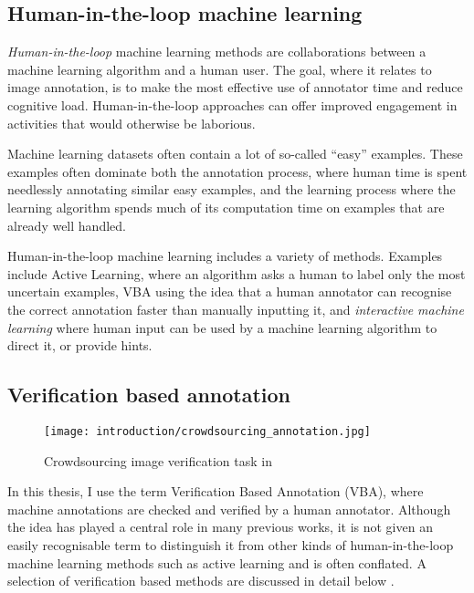 \subsection{Human-in-the-loop machine learning}

\emph{Human-in-the-loop} machine learning methods are collaborations between a machine learning algorithm and a human user. The goal, where it relates to image annotation, is to make the most effective use of annotator time and reduce cognitive load. Human-in-the-loop approaches can offer improved engagement in activities that would otherwise be laborious.

Machine learning datasets often contain a lot of so-called ``easy'' examples. These examples often dominate both the annotation process, where human time is spent needlessly annotating similar easy examples, and the learning process where the learning algorithm spends much of its computation time on examples that are already well handled. 

Human-in-the-loop machine learning includes a variety of methods. Examples include Active Learning, where an algorithm asks a human to label only the most uncertain examples, \gls{VBA} using the idea that a human annotator can recognise the correct annotation faster than manually inputting it, and \emph{interactive machine learning} where human input can be used by a machine learning algorithm to direct it, or provide hints. 

\subsection{Verification based annotation}

\begin{figure}[h]
  \centering
  \texttt{[image: introduction/crowdsourcing\_annotation.jpg]}
  \caption{Crowdsourcing image verification task in \cite{Su2012a}} 
  \label{fig:crowdsourcing}
\end{figure}

In this thesis, I use the term Verification Based Annotation (VBA), where machine annotations are checked and verified by a human annotator. Although the idea has played a central role in many previous works, it is not given an easily recognisable term to distinguish it from other kinds of human-in-the-loop machine learning methods such as active learning and is often conflated. A selection of verification based methods are discussed in detail below \cite{Yao2012, McNeill2011, Adhikaria2018, Castrejon2017, Papadopoulos2016, Russakovsky2015a}. 

